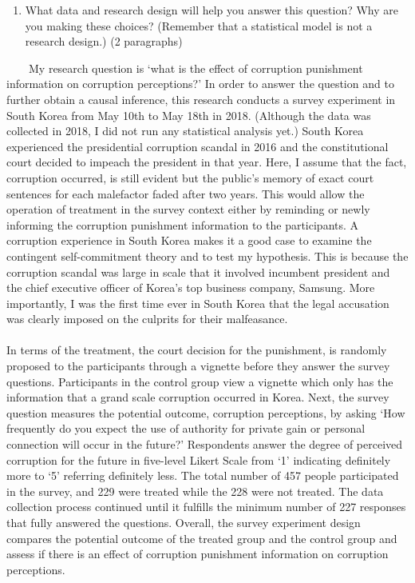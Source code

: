 \documentclass[
  11pt,
]{article}
\providecommand{\tightlist}{%
  \setlength{\itemsep}{0pt}\setlength{\parskip}{0pt}}
\begin{document}
\begin{enumerate}
\def\labelenumi{\arabic{enumi}.}
\setcounter{enumi}{2}
\tightlist
\item
  What data and research design will help you answer this question? Why
  are you making these choices? (Remember that a statistical model is
  not a research design.) (2 paragraphs)
\end{enumerate}

~~~~My research question is `what is the effect of corruption punishment
information on corruption perceptions?' In order to answer the question
and to further obtain a causal inference, this research conducts a
survey experiment in South Korea from May 10th to May 18th in 2018.
(Although the data was collected in 2018, I did not run any statistical
analysis yet.) South Korea experienced the presidential corruption
scandal in 2016 and the constitutional court decided to impeach the
president in that year. Here, I assume that the fact, corruption
occurred, is still evident but the public's memory of exact court
sentences for each malefactor faded after two years. This would allow
the operation of treatment in the survey context either by reminding or
newly informing the corruption punishment information to the
participants. A corruption experience in South Korea makes it a good
case to examine the contingent self-commitment theory and to test my
hypothesis. This is because the corruption scandal was large in scale
that it involved incumbent president and the chief executive officer of
Korea's top business company, Samsung. More importantly, I was the first
time ever in South Korea that the legal accusation was clearly imposed
on the culprits for their malfeasance.\\
~\\
\hspace*{0.333em}\hspace*{0.333em}\hspace*{0.333em}\hspace*{0.333em}\hspace*{0.333em}In
terms of the treatment, the court decision for the punishment, is
randomly proposed to the participants through a vignette before they
answer the survey questions. Participants in the control group view a
vignette which only has the information that a grand scale corruption
occurred in Korea. Next, the survey question measures the potential
outcome, corruption perceptions, by asking `How frequently do you expect
the use of authority for private gain or personal connection will occur
in the future?' Respondents answer the degree of perceived corruption
for the future in five-level Likert Scale from `1' indicating definitely
more to `5' referring definitely less. The total number of 457 people
participated in the survey, and 229 were treated while the 228 were not
treated. The data collection process continued until it fulfills the
minimum number of 227 responses that fully answered the questions.
Overall, the survey experiment design compares the potential outcome of
the treated group and the control group and assess if there is an effect
of corruption punishment information on corruption perceptions.
\end{document}
